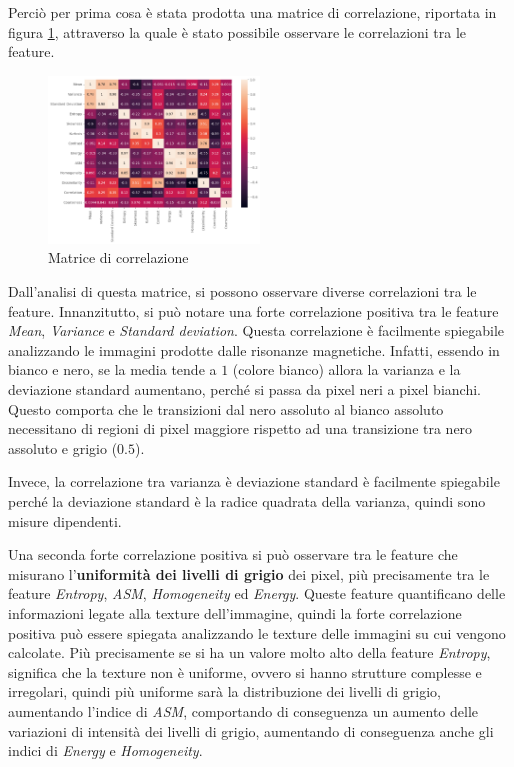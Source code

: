 Perciò per prima cosa è stata prodotta una matrice di correlazione, riportata in
figura \ref{fig:corr-matrix}, attraverso la quale è stato possibile osservare le
correlazioni tra le feature.
\begin{figure}[!ht]
      \centering
      \includegraphics[width=0.5\textwidth]{img/analisi/corr.png}
      \caption{Matrice di correlazione}
      \label{fig:corr-matrix}
\end{figure}

Dall'analisi di questa matrice, si possono osservare diverse correlazioni tra le
feature. Innanzitutto, si può notare una forte correlazione positiva tra le
feature \textit{Mean}, \textit{Variance} e \textit{Standard deviation}. Questa
correlazione è facilmente spiegabile analizzando le immagini prodotte dalle
risonanze magnetiche. Infatti, essendo in bianco e nero, se la media tende a $1$
(colore bianco) allora la varianza e la deviazione standard aumentano, perché si
passa da pixel neri a pixel bianchi. Questo comporta che le transizioni dal nero
assoluto al bianco assoluto necessitano di regioni di pixel maggiore rispetto
ad una transizione tra nero assoluto e grigio ($0.5$).

Invece, la correlazione tra varianza è deviazione standard è facilmente spiegabile
perché la deviazione standard è la radice quadrata della varianza, quindi sono
misure dipendenti.

Una seconda forte correlazione positiva si può osservare tra le feature che
misurano l'\textbf{uniformità dei livelli di grigio} dei pixel, più precisamente
tra le feature \textit{Entropy}, \textit{ASM}, \textit{Homogeneity} ed
\textit{Energy}. Queste feature quantificano delle informazioni legate alla
texture dell'immagine, quindi la forte correlazione positiva può essere spiegata
analizzando le texture delle immagini su cui vengono calcolate. Più precisamente
se si ha un valore molto alto della feature \textit{Entropy}, significa che la
texture non è uniforme, ovvero si hanno strutture complesse e irregolari, quindi
più uniforme sarà la distribuzione dei livelli di grigio, aumentando l'indice
di \textit{ASM}, comportando di conseguenza un aumento delle variazioni di intensità
dei livelli di grigio, aumentando di conseguenza anche gli indici di \textit{Energy}
e \textit{Homogeneity}.

